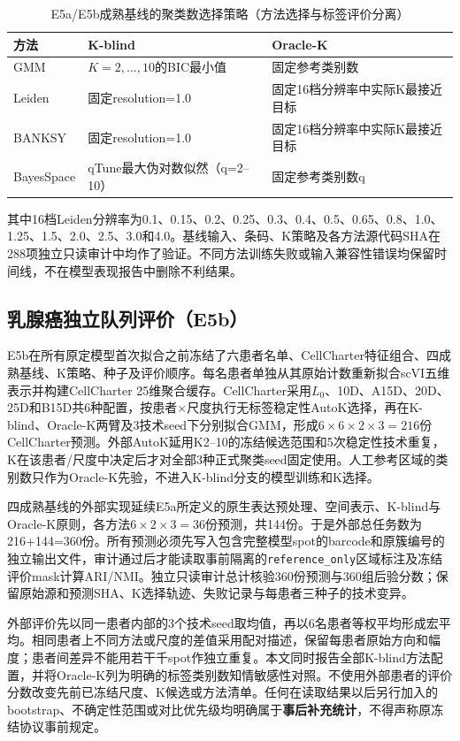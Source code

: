 \begin{table}[htbp]
\centering
\caption{E5a/E5b成熟基线的聚类数选择策略（方法选择与标签评价分离）}
\label{tab:cc-baseline-K-v1}
\begin{tabular}{lll}
\toprule
方法 & K-blind & Oracle-K\\
\midrule
GMM & $K=2,\ldots,10$的BIC最小值 & 固定参考类别数\\
Leiden & 固定resolution=1.0 & 固定16档分辨率中实际K最接近目标\\
BANKSY & 固定resolution=1.0 & 固定16档分辨率中实际K最接近目标\\
BayesSpace & qTune最大伪对数似然（q=2--10） & 固定参考类别数q\\
\bottomrule
\end{tabular}
\end{table}

其中16档Leiden分辨率为0.1、0.15、0.2、0.25、0.3、0.4、0.5、0.65、0.8、1.0、1.25、1.5、2.0、2.5、3.0和4.0。基线输入、条码、K策略及各方法源代码SHA在288项独立只读审计中均作了验证。不同方法训练失败或输入兼容性错误均保留时间线，不在模型表现报告中删除不利结果。

\subsection{乳腺癌独立队列评价（E5b）}
\label{subsec:cc-e5b-v1}

E5b在所有原定模型首次拟合之前冻结了六患者名单、CellCharter特征组合、四成熟基线、K策略、种子及评价顺序。每名患者单独从其原始计数重新拟合scVI五维表示并构建CellCharter 25维聚合缓存。CellCharter采用$L_0$、10D、A15D、20D、25D和B15D共6种配置，按患者$\times$尺度执行无标签稳定性AutoK选择，再在K-blind、Oracle-K两臂及3技术seed下分别拟合GMM，形成$6\times6\times2\times3=216$份CellCharter预测。外部AutoK延用K2--10的冻结候选范围和5次稳定性技术重复，K在该患者/尺度中决定后才对全部3种正式聚类seed固定使用。人工参考区域的类别数只作为Oracle-K先验，不进入K-blind分支的模型训练和K选择。

四成熟基线的外部实现延续E5a所定义的原生表达预处理、空间表示、K-blind与Oracle-K原则，各方法$6\times2\times3=36$份预测，共144份。于是外部总任务数为216+144=360份。所有预测必须先写入包含完整模型spot的barcode和原簇编号的独立输出文件，审计通过后才能读取事前隔离的\texttt{reference\_only}区域标注及冻结评价mask计算ARI/NMI。独立只读审计总计核验360份预测与360组后验分数；保留原始源和预测SHA、K选择轨迹、失败记录与每患者三种子的技术变异。

外部评价先以同一患者内部的3个技术seed取均值，再以6名患者等权平均形成宏平均。相同患者上不同方法或尺度的差值采用配对描述，保留每患者原始方向和幅度；患者间差异不能用若干千spot作独立重复。本文同时报告全部K-blind方法配置，并将Oracle-K列为明确的标签类别数知情敏感性对照。不使用外部患者的评价分数改变先前已冻结尺度、K候选或方法清单。任何在读取结果以后另行加入的bootstrap、不确定性范围或对比优先级均明确属于\textbf{事后补充统计}，不得声称原冻结协议事前规定。

